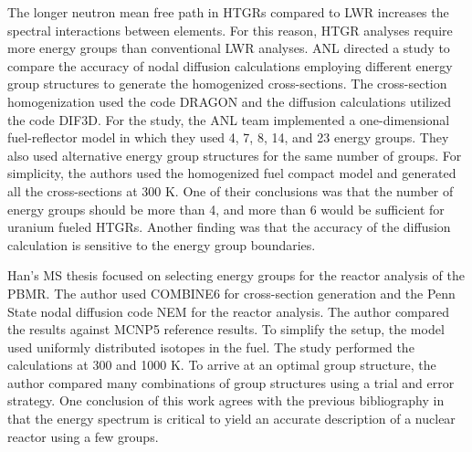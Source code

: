 
The longer neutron mean free path in \glspl{HTGR} compared to \gls{LWR} increases the spectral interactions between elements.
For this reason, \gls{HTGR} analyses require more energy groups than conventional \gls{LWR} analyses.
\gls{ANL} directed a study \cite{lee_status_2006} to compare the accuracy of nodal diffusion calculations employing different energy group structures to generate the homogenized cross-sections.
The cross-section homogenization used the code DRAGON and the diffusion calculations utilized the code DIF3D.
For the study, the ANL team implemented a one-dimensional fuel-reflector model in which they used 4, 7, 8, 14, and 23 energy groups.
They also used alternative energy group structures for the same number of groups.
For simplicity, the authors used the homogenized fuel compact model and generated all the cross-sections at 300 K.
One of their conclusions was that the number of energy groups should be more than 4, and more than 6 would be sufficient for uranium fueled \glspl{HTGR}.
Another finding was that the accuracy of the diffusion calculation is sensitive to the energy group boundaries.

Han's MS thesis \cite{han_sensitivity_2008} focused on selecting energy groups for the reactor analysis of the \gls{PBMR}.
The author used COMBINE6 \cite{grimesey_combinepc-portable_1994} for cross-section generation and the Penn State nodal diffusion code NEM \cite{bandini_three-dimensional_1990} for the reactor analysis.
The author compared the results against MCNP5 reference results.
To simplify the setup, the model used uniformly distributed isotopes in the fuel.
The study performed the calculations at 300 and 1000 K.
To arrive at an optimal group structure, the author compared many combinations of group structures using a trial and error strategy.
One conclusion of this work agrees with the previous bibliography \cite{gulf_oil_company_nuclear_1973} \cite{duderstadt_nuclear_1976} in that the energy spectrum is critical to yield an accurate description of a nuclear reactor using a few groups.

